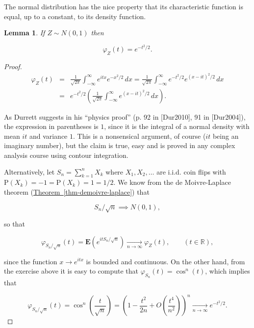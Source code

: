 \documentclass[11pt]{report}
\newcommand{\R}{\mathbb{R}}
\theoremstyle{plain}
\newtheorem{lem}[thm]{Lemma}
\theoremstyle{definition}
\begin{document}
\noindent The normal distribution has the nice property that
its characteristic function is equal, up to a
constant, to its density function.

\begin{lem}
If $Z\sim N(0,1)$ then

\[
\varphi_Z(t) = e^{-t^2/2}.
\]

\end{lem}

\begin{proof}

\begin{eqnarray*} \varphi_Z(t) &=& \frac{1}{\sqrt{2\pi}}\int_{-\infty}^\infty e^{itx} e^{-x^2/2}\,dx = \frac{1}{\sqrt{2\pi}}
\int_{-\infty}^\infty e^{-t^2/2} e^{(x-it)^2/2}\,dx \\
&=& e^{-t^2/2} \left( \frac{1}{\sqrt{2\pi}}\int_{-\infty}^\infty  e^{(x-it)^2/2}\,dx \right).
\end{eqnarray*}

\noindent As Durrett suggests in his ``physics proof'' (p. 92
in [Dur2010], 91 in [Dur2004]), the expression in
parentheses is $1$, since it is the integral of a
normal density with mean $it$ and variance $1$. This
is a nonsensical argument, of course ($it$ being an
imaginary number), but the claim is true, easy  and is
proved in any complex analysis course using contour
integration.

Alternatively, let $S_n=\sum_{k=1}^n X_k$ where
$X_1,X_2,\ldots$ are i.i.d. coin flips with
$\mathrm{P}(X_k)=-1=\mathrm{P}(X_k)=1=1/2$. We know
from the de Moivre-Laplace theorem (\texorpdfstring{\hyperref[thm-demoivre-laplace]{Theorem~\ref*{thm-demoivre-laplace}}}{Theorem}) that

\[
S_n/\sqrt{n} \implies N(0,1),
\]

\noindent so that

\[
\varphi_{S_n/\sqrt{n}}(t) = \mathbf{E}\left( e^{it S_n/\sqrt{n}} \right) \xrightarrow[n\to\infty]{} \varphi_Z(t),
\qquad (t\in\R),
\]

\noindent since the function $x\to e^{i t x}$ is bounded and
continuous. On the other hand, from the exercise above
it is easy to compute that
$\varphi_{S_n}(t) = \cos^n(t)$, which implies that

\[
\varphi_{S_n/\sqrt{n}}(t) = \cos^n\left(\frac{t}{\sqrt{n}}\right)= \left(1-\frac{t^2}{2n} + O\left(\frac{t^4}{n^2}\right)\right)^n \xrightarrow[n\to\infty]{} e^{-t^2/2}.
\]

\end{proof}
\end{document}
